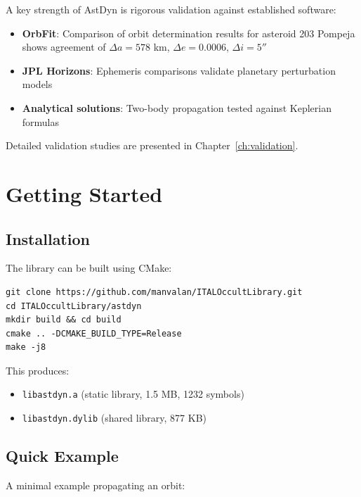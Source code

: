 A key strength of AstDyn is rigorous validation against established software:

\begin{itemize}
    \item \textbf{OrbFit}: Comparison of orbit determination results for asteroid 203 Pompeja shows agreement of $\Delta a = 578$ km, $\Delta e = 0.0006$, $\Delta i = 5''$
    \item \textbf{JPL Horizons}: Ephemeris comparisons validate planetary perturbation models
    \item \textbf{Analytical solutions}: Two-body propagation tested against Keplerian formulas
\end{itemize}

Detailed validation studies are presented in Chapter~\ref{ch:validation}.

\section{Getting Started}

\subsection{Installation}

The library can be built using CMake:

\begin{lstlisting}[style=cpp,caption={Building AstDyn}]
git clone https://github.com/manvalan/ITALOccultLibrary.git
cd ITALOccultLibrary/astdyn
mkdir build && cd build
cmake .. -DCMAKE_BUILD_TYPE=Release
make -j8
\end{lstlisting}

This produces:
\begin{itemize}
    \item \texttt{libastdyn.a} (static library, 1.5 MB, 1232 symbols)
    \item \texttt{libastdyn.dylib} (shared library, 877 KB)
\end{itemize}

\subsection{Quick Example}

A minimal example propagating an orbit:

